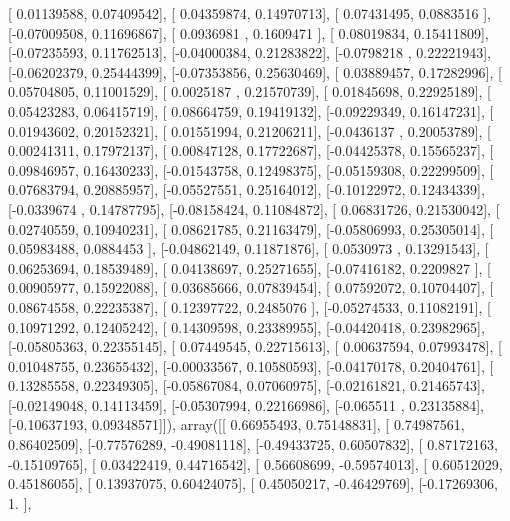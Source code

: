 \documentclass{article}
\begin{document}
       [ 0.01139588,  0.07409542],
       [ 0.04359874,  0.14970713],
       [ 0.07431495,  0.0883516 ],
       [-0.07009508,  0.11696867],
       [ 0.0936981 ,  0.1609471 ],
       [ 0.08019834,  0.15411809],
       [-0.07235593,  0.11762513],
       [-0.04000384,  0.21283822],
       [-0.0798218 ,  0.22221943],
       [-0.06202379,  0.25444399],
       [-0.07353856,  0.25630469],
       [ 0.03889457,  0.17282996],
       [ 0.05704805,  0.11001529],
       [ 0.0025187 ,  0.21570739],
       [ 0.01845698,  0.22925189],
       [ 0.05423283,  0.06415719],
       [ 0.08664759,  0.19419132],
       [-0.09229349,  0.16147231],
       [ 0.01943602,  0.20152321],
       [ 0.01551994,  0.21206211],
       [-0.0436137 ,  0.20053789],
       [ 0.00241311,  0.17972137],
       [ 0.00847128,  0.17722687],
       [-0.04425378,  0.15565237],
       [ 0.09846957,  0.16430233],
       [-0.01543758,  0.12498375],
       [-0.05159308,  0.22299509],
       [ 0.07683794,  0.20885957],
       [-0.05527551,  0.25164012],
       [-0.10122972,  0.12434339],
       [-0.0339674 ,  0.14787795],
       [-0.08158424,  0.11084872],
       [ 0.06831726,  0.21530042],
       [ 0.02740559,  0.10940231],
       [ 0.08621785,  0.21163479],
       [-0.05806993,  0.25305014],
       [ 0.05983488,  0.0884453 ],
       [-0.04862149,  0.11871876],
       [ 0.0530973 ,  0.13291543],
       [ 0.06253694,  0.18539489],
       [ 0.04138697,  0.25271655],
       [-0.07416182,  0.2209827 ],
       [ 0.00905977,  0.15922088],
       [ 0.03685666,  0.07839454],
       [ 0.07592072,  0.10704407],
       [ 0.08674558,  0.22235387],
       [ 0.12397722,  0.2485076 ],
       [-0.05274533,  0.11082191],
       [ 0.10971292,  0.12405242],
       [ 0.14309598,  0.23389955],
       [-0.04420418,  0.23982965],
       [-0.05805363,  0.22355145],
       [ 0.07449545,  0.22715613],
       [ 0.00637594,  0.07993478],
       [ 0.01048755,  0.23655432],
       [-0.00033567,  0.10580593],
       [-0.04170178,  0.20404761],
       [ 0.13285558,  0.22349305],
       [-0.05867084,  0.07060975],
       [-0.02161821,  0.21465743],
       [-0.02149048,  0.14113459],
       [-0.05307994,  0.22166986],
       [-0.065511  ,  0.23135884],
       [-0.10637193,  0.09348571]]), array([[ 0.66955493,  0.75148831],
       [ 0.74987561,  0.86402509],
       [-0.77576289, -0.49081118],
       [-0.49433725,  0.60507832],
       [ 0.87172163, -0.15109765],
       [ 0.03422419,  0.44716542],
       [ 0.56608699, -0.59574013],
       [ 0.60512029,  0.45186055],
       [ 0.13937075,  0.60424075],
       [ 0.45050217, -0.46429769],
       [-0.17269306,  1.        ],
\end{document}
